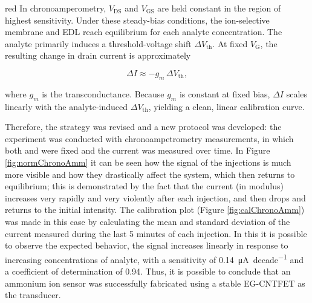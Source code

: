 \begin{color}{red}
In chronoamperometry, $V_{\mathrm{DS}}$ and $V_{\mathrm{GS}}$ are held constant in the region of highest sensitivity.
Under these steady-bias conditions, the ion-selective membrane and EDL reach equilibrium for each analyte concentration.
The analyte primarily induces a threshold-voltage shift $\Delta V_{\mathrm{th}}$.
At fixed $V_{\mathrm{G}}$, the resulting change in drain current is approximately

\[
\Delta I \approx - g_m \, \Delta V_{\mathrm{th}},
\]

where $g_m$ is the transconductance.
Because $g_m$ is constant at fixed bias, $\Delta I$ scales linearly with the analyte-induced $\Delta V_{\mathrm{th}}$, yielding a clean, linear calibration curve.

\end{color}

Therefore, the strategy was revised and a new protocol was developed: the experiment was conducted with chronoampetrometry measurements, in which both \vds{} and \vgs{} were fixed and the current was measured over time. In Figure \ref{fig:normChronoAmm} it can be seen how the signal of the injections is much more visible and how they drastically affect the system, which then returns to equilibrium; this is demonstrated by the fact that the current (in modulus) increases very rapidly and very violently after each injection, and then drops and returns to the initial intensity. The calibration plot (Figure \ref{fig:calChronoAmm}) was made in this case by calculating the mean and standard deviation of the current measured during the last 5 minutes of each injection. In this it is possible to observe the expected behavior, \ie{} the signal increases linearly in response to increasing concentrations of analyte, with a sensitivity of \SI{0.14}{\uA \per decade} and a coefficient of determination of 0.94. Thus, it is possible to conclude that an ammonium ion sensor was successfully fabricated using a stable EG-CNTFET as the transducer.

